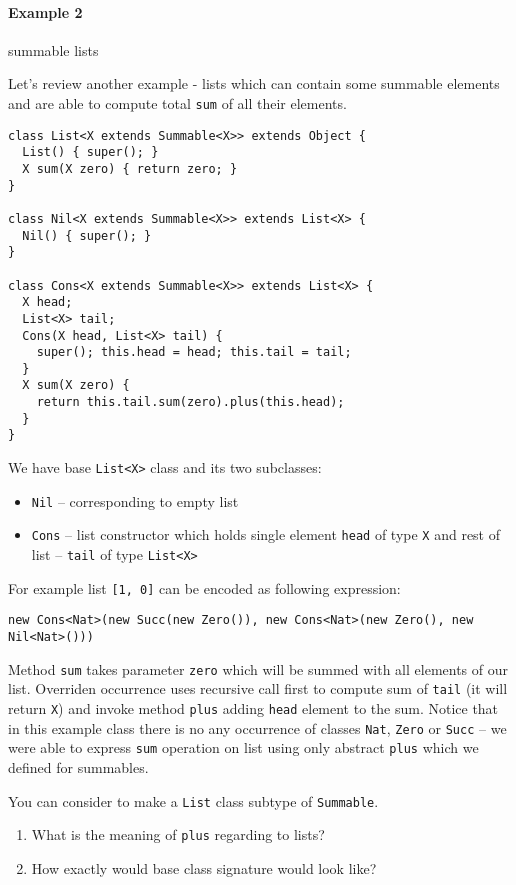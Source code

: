 \documentclass{article}[12pt]
\begin{document}
\paragraph{Example 2} summable lists

Let's review another example - lists which can contain some
summable elements and are able to compute total \texttt{sum} of
all their elements.

\begin{verbatim}
class List<X extends Summable<X>> extends Object {
  List() { super(); }
  X sum(X zero) { return zero; }
}

class Nil<X extends Summable<X>> extends List<X> {
  Nil() { super(); }
}

class Cons<X extends Summable<X>> extends List<X> {
  X head;
  List<X> tail;
  Cons(X head, List<X> tail) {
    super(); this.head = head; this.tail = tail;
  }
  X sum(X zero) {
    return this.tail.sum(zero).plus(this.head);
  }
}
\end{verbatim}
We have base \texttt{List<X>} class and its two subclasses:
\begin{itemize}
\item \texttt{Nil} -- corresponding to empty list
\item \texttt{Cons} -- list constructor which holds single
  element \texttt{head} of type \texttt{X} and rest of list
   -- \texttt{tail} of type \texttt{List<X>}
\end{itemize}
For example list \texttt{[1, 0]} can be encoded as following
expression:

\begin{verbatim}
new Cons<Nat>(new Succ(new Zero()), new Cons<Nat>(new Zero(), new Nil<Nat>()))
\end{verbatim}

Method \texttt{sum} takes parameter \texttt{zero} which will
be summed with all elements of our list. Overriden occurrence
uses recursive call first to compute sum of \texttt{tail} (it will
return \texttt{X}) and invoke method \texttt{plus} adding
\texttt{head} element to the sum. Notice that in this example
class there is no any occurrence of classes \texttt{Nat},
\texttt{Zero} or \texttt{Succ} -- we were able to express
\texttt{sum} operation on list using only abstract \texttt{plus}
which we defined for summables.

You can consider to make a \texttt{List} class subtype of
\texttt{Summable}.
\begin{enumerate}
\item What is the meaning of \texttt{plus} regarding to lists?
\item How exactly would base class signature would look like?
\end{enumerate}
\end{document}
